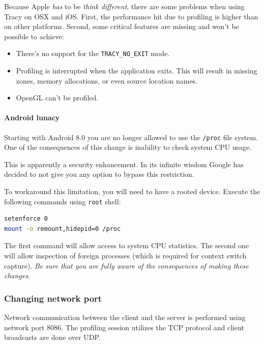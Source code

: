 \documentclass[hidelinks,titlepage,a4paper]{article}
\begin{document}
Because Apple \emph{has} to be \emph{think different}, there are some problems when using Tracy on OSX and iOS. First, the performance hit due to profiling is higher than on other platforms. Second, some critical features are missing and won't be possible to achieve:

\begin{itemize}
\item There's no support for the \texttt{TRACY\_NO\_EXIT} mode.
\item Profiling is interrupted when the application exits. This will result in missing zones, memory allocations, or even source location names.
\item OpenGL can't be profiled.
\end{itemize}

\paragraph{Android lunacy}
\label{androidlunacy}

Starting with Android 8.0 you are no longer allowed to use the \texttt{/proc} file system. One of the consequences of this change is inability to check system CPU usage.

This is apparently a security enhancement. In its infinite wisdom Google has decided to not give you any option to bypass this restriction.

To workaround this limitation, you will need to have a rooted device. Execute the following commands using \texttt{root} shell:

\begin{lstlisting}[language=sh]
setenforce 0
mount -o remount,hidepid=0 /proc
\end{lstlisting}

The first command will allow access to system CPU statistics. The second one will allow inspection of foreign processes (which is required for context switch capture). \emph{Be sure that you are fully aware of the consequences of making these changes.}

\subsubsection{Changing network port}

Network communication between the client and the server is performed using network port 8086. The profiling session utilizes the TCP protocol and client broadcasts are done over UDP.
\end{document}
